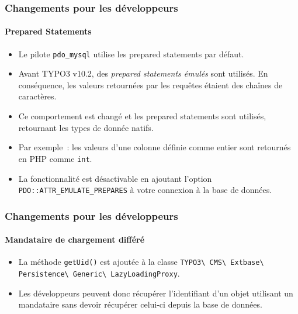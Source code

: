 \begin{frame}[fragile]
	\frametitle{Changements pour les développeurs}
	\framesubtitle{Prepared Statements}

	\lstset{basicstyle=\tiny\ttfamily}

	\begin{itemize}
		\item Le pilote \texttt{pdo\_mysql} utilise les prepared statements par défaut.
		\item Avant TYPO3 v10.2, des \textit{prepared statements émulés} sont utilisés.
			En conséquence, les valeurs retournées par les requêtes étaient des chaînes de caractères.
		\item Ce comportement est changé et les prepared statements sont utilisés,
			retournant les types de donnée natifs.
		\item Par exemple~: les valeurs d'une colonne définie comme entier sont retournés en PHP comme \texttt{int}.
		\item La fonctionnalité est désactivable en ajoutant l'option
			\texttt{PDO::ATTR\_EMULATE\_PREPARES} à votre connexion à la base de données.

	\end{itemize}

\end{frame}


\begin{frame}[fragile]
	\frametitle{Changements pour les développeurs}
	\framesubtitle{Mandataire de chargement différé}

	\lstset{basicstyle=\tiny\ttfamily}

	\begin{itemize}
		\item La méthode \texttt{getUid()} est ajoutée à la classe\newline
			\texttt{TYPO3\textbackslash
				CMS\textbackslash
				Extbase\textbackslash
				Persistence\textbackslash
				Generic\textbackslash
				LazyLoadingProxy}.
		\item Les développeurs peuvent donc récupérer l'identifiant d'un objet utilisant un mandataire
			sans devoir récupérer celui-ci depuis la base de données.

	\end{itemize}

\end{frame}

